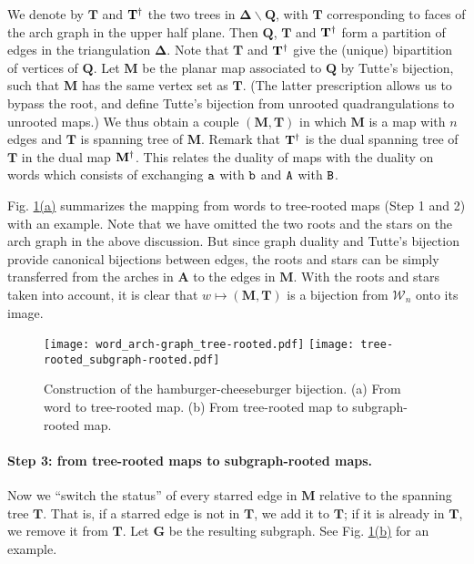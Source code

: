 \documentclass[a4paper]{article}
\newcommand{\refnote}[2]{\hyperref[#1]{\ref*{#1}#2}}
\newcommand*{\map}{\mathbf}
\newcommand*{\W}{\mathcal{W}}
\newcommand*{\m}{\map{M}}
\begin{document}
We denote by $\map{T}$ and $\map{T}^\dual$ the two trees in $\map{\Delta\backslash Q}$, with $\map{T}$ corresponding to faces of the arch graph in the upper half plane.
Then $\map{Q}$,\! $\map{T}$\! and\! $\map{T}^\dual$ form a partition of edges in the triangulation $\map{\Delta}$.
Note that $\map{T}$ and $\map{T}^\dual$ give the (unique) bipartition of vertices of $\map{Q}$.
Let $\m $ be the planar map associated to $\map{Q}$ by Tutte's bijection, such that $\m $ has the same vertex set as $\map{T}$.
(The latter prescription allows us to bypass the root, and define Tutte's bijection from unrooted quadrangulations to unrooted maps.)
We thus obtain a couple $(\map{M,T})$ in which $\m $ is a map with $n$ edges and $\map{T}$ is spanning tree of $\m $.
Remark that $\map{T}^\dual$ is the dual spanning tree of $\map{T}$ in the dual map $\m^\dual$.
This relates the duality of maps with the duality on words which consists of exchanging $\mathtt{a}$ with $\mathtt{b}$ and $\mathtt{A}$ with $\mathtt{B}$.

Fig. \refnote{fig:step 1-2}{(a)} summarizes the mapping from words to tree-rooted maps (Step 1 and 2) with an example.
Note that we have omitted the two roots and the stars on the arch graph in the above discussion.
But since graph duality and Tutte's bijection provide canonical bijections between edges, the roots and stars can be simply transferred from the arches in $\map{A}$ to the edges in $\m $.
With the roots and stars taken into account, it is clear that $w\mapsto(\map{M,T})$ is a bijection from $\W_n$ onto its image.

\begin{figure}[ht!]
\captionsetup{width=0.8\textwidth}
\begin{center}
\texttt{[image: word\_arch-graph\_tree-rooted.pdf]}
\texttt{[image: tree-rooted\_subgraph-rooted.pdf]}
\caption{Construction of the hamburger-cheeseburger bijection.
(a) From word to tree-rooted map. (b) From tree-rooted map to subgraph-rooted map.
}
\label{fig:step 1-2}
\end{center}
\end{figure}
\paragraph{Step 3: from tree-rooted maps to subgraph-rooted maps.}
Now we ``switch the status'' of every starred edge in $\m $ relative to the spanning tree $\map{T}$.
That is, if a starred edge is not in $\map{T}$, we add it to $\map{T}$; if it is already in $\map{T}$, we remove it from $\map{T}$.
Let $\map{G}$ be the resulting subgraph.
See Fig. \refnote{fig:step 1-2}{(b)} for an example.
\end{document}
